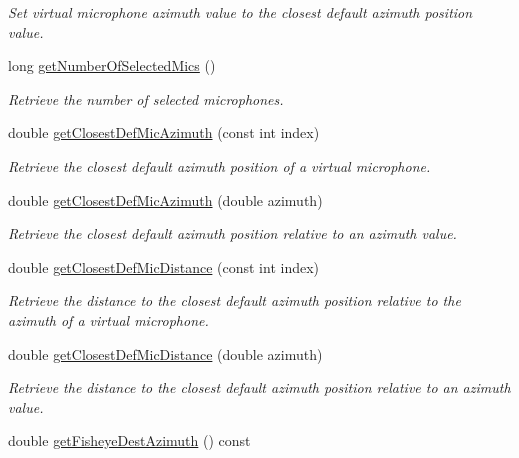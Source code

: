 \begin{DoxyCompactItemize}
\begin{DoxyCompactList}\small\item\em Set virtual microphone azimuth value to the closest default azimuth position value. \end{DoxyCompactList}\item 
long \hyperlink{class_hoa2_d_1_1_virtual_mic_manager_ad410ea735c2d90d55d7e438d3527ef57}{get\-Number\-Of\-Selected\-Mics} ()
\begin{DoxyCompactList}\small\item\em Retrieve the number of selected microphones. \end{DoxyCompactList}\item 
double \hyperlink{class_hoa2_d_1_1_virtual_mic_manager_aab43c873ac5968e3c2023ee2b0ce2e24}{get\-Closest\-Def\-Mic\-Azimuth} (const int index)
\begin{DoxyCompactList}\small\item\em Retrieve the closest default azimuth position of a virtual microphone. \end{DoxyCompactList}\item 
double \hyperlink{class_hoa2_d_1_1_virtual_mic_manager_a5e055290edf0b236927a057836463bfe}{get\-Closest\-Def\-Mic\-Azimuth} (double azimuth)
\begin{DoxyCompactList}\small\item\em Retrieve the closest default azimuth position relative to an azimuth value. \end{DoxyCompactList}\item 
double \hyperlink{class_hoa2_d_1_1_virtual_mic_manager_a6e6ad752d94fad0fb1c6ad014bdf29fb}{get\-Closest\-Def\-Mic\-Distance} (const int index)
\begin{DoxyCompactList}\small\item\em Retrieve the distance to the closest default azimuth position relative to the azimuth of a virtual microphone. \end{DoxyCompactList}\item 
double \hyperlink{class_hoa2_d_1_1_virtual_mic_manager_af7eacde3002e30fc45eda1a2133a1e6e}{get\-Closest\-Def\-Mic\-Distance} (double azimuth)
\begin{DoxyCompactList}\small\item\em Retrieve the distance to the closest default azimuth position relative to an azimuth value. \end{DoxyCompactList}\item 
double \hyperlink{class_hoa2_d_1_1_virtual_mic_manager_ae811a1625b2698dc3229281fe0dd361e}{get\-Fisheye\-Dest\-Azimuth} () const 

\end{DoxyCompactItemize}
